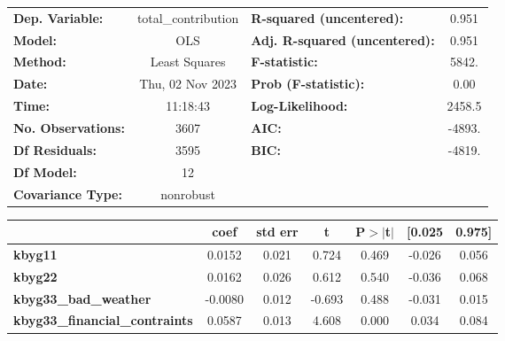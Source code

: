\begin{center}
\begin{tabular}{lclc}
\toprule
\textbf{Dep. Variable:}                      & total\_contribution & \textbf{  R-squared (uncentered):}      &     0.951   \\
\textbf{Model:}                              &         OLS         & \textbf{  Adj. R-squared (uncentered):} &     0.951   \\
\textbf{Method:}                             &    Least Squares    & \textbf{  F-statistic:       }          &     5842.   \\
\textbf{Date:}                               &   Thu, 02 Nov 2023  & \textbf{  Prob (F-statistic):}          &     0.00    \\
\textbf{Time:}                               &       11:18:43      & \textbf{  Log-Likelihood:    }          &    2458.5   \\
\textbf{No. Observations:}                   &          3607       & \textbf{  AIC:               }          &    -4893.   \\
\textbf{Df Residuals:}                       &          3595       & \textbf{  BIC:               }          &    -4819.   \\
\textbf{Df Model:}                           &            12       & \textbf{                     }          &             \\
\textbf{Covariance Type:}                    &      nonrobust      & \textbf{                     }          &             \\
\bottomrule
\end{tabular}
\begin{tabular}{lcccccc}
                                             & \textbf{coef} & \textbf{std err} & \textbf{t} & \textbf{P$> |$t$|$} & \textbf{[0.025} & \textbf{0.975]}  \\
\midrule
\textbf{kbyg11}                              &       0.0152  &        0.021     &     0.724  &         0.469        &       -0.026    &        0.056     \\
\textbf{kbyg22}                              &       0.0162  &        0.026     &     0.612  &         0.540        &       -0.036    &        0.068     \\
\textbf{kbyg33\_bad\_weather}                &      -0.0080  &        0.012     &    -0.693  &         0.488        &       -0.031    &        0.015     \\
\textbf{kbyg33\_financial\_contraints}       &       0.0587  &        0.013     &     4.608  &         0.000        &        0.034    &        0.084     \\

\end{tabular}
\end{center}

